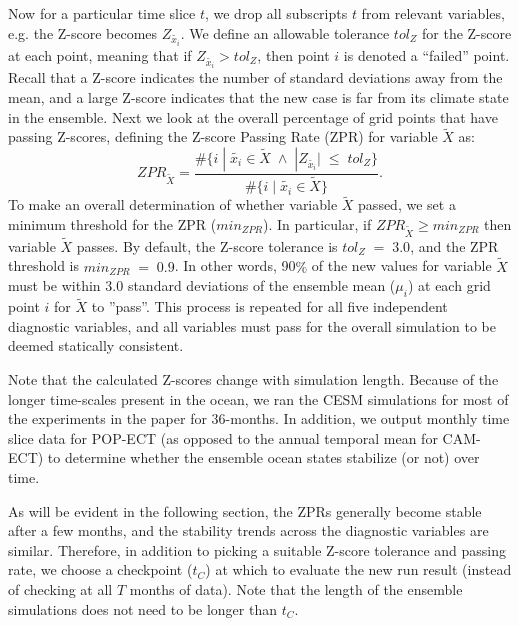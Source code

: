 \documentclass[gmd, manuscript]{copernicus}
\begin{document}
Now for a particular time slice $t$, we drop all subscripts $t$ from relevant variables, e.g. the Z-score becomes $Z_{\tilde{x_i}}$.
We define an allowable tolerance $tol_{Z}$ for the Z-score at each point, meaning that if $Z_{\tilde{x_i}} > tol_{Z}$, then point $i$ is denoted a ``failed'' point. 
Recall that a Z-score indicates the number of standard deviations away from the mean, and a large Z-score indicates that the new case is far from its climate state in the ensemble.
Next we look at the overall percentage of grid points that have passing  Z-scores, defining the Z-score Passing Rate (ZPR) for variable $\tilde{X}$  as:
\begin{equation}\label{e:zpr}
ZPR_{\tilde{X}} = \frac{ \#\{i \;|\; \tilde{x_i} \in \tilde{X} \; \land \; |Z_{\tilde{x_i}}| \; \leq \; tol_{Z}\} }{\#\{i \;|\; \tilde{x_i} \in \tilde{X} \} }.
\end{equation}
To make an overall determination of whether variable $\tilde{X}$ passed, we set a minimum threshold for the ZPR ($min_{ZPR}$).  In particular, if $ZPR_{\tilde{X}} \geq min_{ZPR}$ then variable $\tilde{X}$ passes.  
By default,  the Z-score tolerance is $tol_{Z} \; = \; 3.0$, and the ZPR threshold is $min_{ZPR} \; = \; 0.9$.  In other words, 90$\%$ of the new values for variable $\tilde{X}$ must be within $3.0$ standard deviations of the ensemble mean ($\mu_i$) at each grid point $i$ for $\tilde{X}$ to ''pass''.  This process is repeated for all five independent diagnostic variables, and all variables must pass for the overall simulation to be deemed statically consistent.

Note that the calculated Z-scores change with simulation length. Because of the longer time-scales present in the ocean, we ran the CESM simulations for most of the experiments in the paper for 36-months. %
 In addition, we output monthly time slice data for POP-ECT (as opposed to the annual temporal mean for CAM-ECT) to determine whether the ensemble ocean states stabilize (or not) over time.  

As will be evident in the following section, the ZPRs generally become stable after a few months, and the stability trends across the diagnostic variables are similar.  Therefore, in addition to picking a suitable Z-score tolerance and passing rate, we choose a checkpoint ($t_C$) at which to evaluate the new run result (instead of checking at all $T$ months of data).  Note that the length of the ensemble simulations does not need to be longer than $t_C$.
\end{document}
